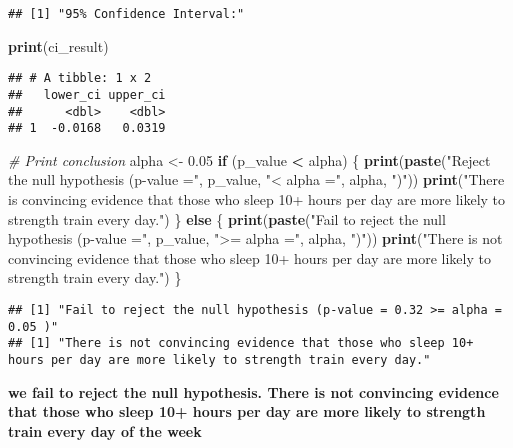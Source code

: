 \documentclass[
]{article}
\newenvironment{Shaded}{\begin{snugshade}}{\end{snugshade}}
\newcommand{\CommentTok}[1]{\textcolor[rgb]{0.56,0.35,0.01}{\textit{#1}}}
\newcommand{\ControlFlowTok}[1]{\textcolor[rgb]{0.13,0.29,0.53}{\textbf{#1}}}
\newcommand{\FloatTok}[1]{\textcolor[rgb]{0.00,0.00,0.81}{#1}}
\newcommand{\FunctionTok}[1]{\textcolor[rgb]{0.13,0.29,0.53}{\textbf{#1}}}
\newcommand{\NormalTok}[1]{#1}
\newcommand{\OtherTok}[1]{\textcolor[rgb]{0.56,0.35,0.01}{#1}}
\newcommand{\SpecialCharTok}[1]{\textcolor[rgb]{0.81,0.36,0.00}{\textbf{#1}}}
\newcommand{\StringTok}[1]{\textcolor[rgb]{0.31,0.60,0.02}{#1}}
\begin{document}
\begin{verbatim}
## [1] "95% Confidence Interval:"
\end{verbatim}

\begin{Shaded}
\begin{Highlighting}[]
\FunctionTok{print}\NormalTok{(ci\_result)}
\end{Highlighting}
\end{Shaded}

\begin{verbatim}
## # A tibble: 1 x 2
##   lower_ci upper_ci
##      <dbl>    <dbl>
## 1  -0.0168   0.0319
\end{verbatim}

\begin{Shaded}
\begin{Highlighting}[]
\CommentTok{\# Print conclusion}
\NormalTok{alpha }\OtherTok{\textless{}{-}} \FloatTok{0.05}
\ControlFlowTok{if}\NormalTok{ (p\_value }\SpecialCharTok{\textless{}}\NormalTok{ alpha) \{}
  \FunctionTok{print}\NormalTok{(}\FunctionTok{paste}\NormalTok{(}\StringTok{"Reject the null hypothesis (p{-}value ="}\NormalTok{, p\_value, }\StringTok{"\textless{} alpha ="}\NormalTok{, alpha, }\StringTok{")"}\NormalTok{))}
  \FunctionTok{print}\NormalTok{(}\StringTok{"There is convincing evidence that those who sleep 10+ hours per day are more likely to strength train every day."}\NormalTok{)}
\NormalTok{\} }\ControlFlowTok{else}\NormalTok{ \{}
  \FunctionTok{print}\NormalTok{(}\FunctionTok{paste}\NormalTok{(}\StringTok{"Fail to reject the null hypothesis (p{-}value ="}\NormalTok{, p\_value, }\StringTok{"\textgreater{}= alpha ="}\NormalTok{, alpha, }\StringTok{")"}\NormalTok{))}
  \FunctionTok{print}\NormalTok{(}\StringTok{"There is not convincing evidence that those who sleep 10+ hours per day are more likely to strength train every day."}\NormalTok{)}
\NormalTok{\}}
\end{Highlighting}
\end{Shaded}

\begin{verbatim}
## [1] "Fail to reject the null hypothesis (p-value = 0.32 >= alpha = 0.05 )"
## [1] "There is not convincing evidence that those who sleep 10+ hours per day are more likely to strength train every day."
\end{verbatim}

\textbf{we fail to reject the null hypothesis. There is not convincing
evidence that those who sleep 10+ hours per day are more likely to
strength train every day of the week}
\end{document}

